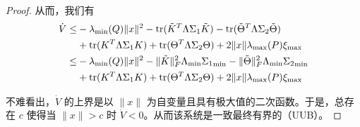 \begin{proof}
    从而，我们有
    \begin{align*}
        \dot{V} \leq & -\lambda_{\min}(Q)\|x\|^2
        -\operatorname{tr}(\tilde{K}^T\Lambda\Sigma_1\tilde{K})
        -\operatorname{tr}(\tilde{\Theta}^T\Lambda\Sigma_2\tilde{\Theta})\\
        &+\operatorname{tr}(K^T \Lambda\Sigma_1 K)+\operatorname{tr}(\Theta^T \Lambda\Sigma_2 \Theta)+2\|x\|\lambda_{\max}(P)\xi_{\max}\\
        \leq & -\lambda_{\min}(Q)\|x\|^2 - \|\tilde{K}\|_F^2\Lambda_{\mathrm{min}}{\Sigma_1}_{\mathrm{min}} - \|\tilde{\Theta}\|_F^2\Lambda_{\mathrm{min}}{\Sigma_2}_{\mathrm{min}} \\
        &+\operatorname{tr}(K^T \Lambda\Sigma_1 K)+\operatorname{tr}(\Theta^T \Lambda\Sigma_2 \Theta)+2\|x\|\lambda_{\max}(P)\xi_{\max}
    \end{align*}

    不难看出，$\dot{V}$ 的上界是以 $\| x \|$ 为自变量且具有极大值的二次函数。于是，总存在 $c$ 使得当 $\| x \| > c$ 时 $\dot{V} < 0$。从而该系统是一致最终有界的（UUB）。
\end{proof}




